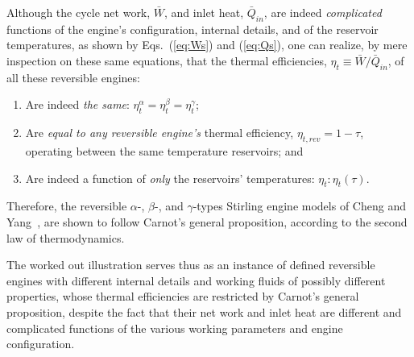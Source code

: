     Although the  cycle  net  work,  $\bar{W}$,  and  inlet  heat,  $\bar{Q}_{in}$,  are  indeed
    \emph{complicated} functions of the engine's configuration, internal  details,  and  of  the
    reservoir temperatures, as shown by Eqs.~(\ref{eq:Ws}) and (\ref{eq:Qs}), one  can  realize,
    by mere inspection on these same equations, that the thermal  efficiencies,  $\eta_t  \equiv
    \bar{W} / \bar{Q}_{in}$, of all these reversible engines:
    \begin{enumerate}
        \item Are indeed \emph{the same}: $\eta^{\alpha}_t = \eta^{\beta}_t = \eta^{\gamma}_t$;
        \item Are \emph{equal to any reversible engine's} thermal efficiency, $\eta_{t,rev} =  1
            - \tau$, operating between the same temperature reservoirs; and
        \item  Are  indeed   a   function   of   \emph{only}   the   reservoirs'   temperatures:
            $\eta_t\!:\!\eta_t(\tau)$.
    \end{enumerate}

    Therefore, the reversible $\alpha$-, $\beta$-, and $\gamma$-types Stirling engine models  of
    Cheng and Yang~\cite{2012-ChengCH+YangHS-ApEnergy}, are shown  to  follow  Carnot's  general
    proposition, according to the second law of thermodynamics.

    The worked out illustration serves thus as an instance of defined  reversible  engines  with
    different internal details and  working  fluids  of  possibly  different  properties,  whose
    thermal efficiencies are restricted by Carnot's general proposition, despite the  fact  that
    their net work and inlet heat are different and complicated functions of the various working
    parameters and engine configuration.


